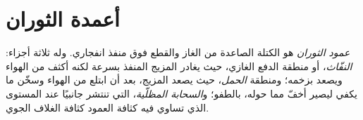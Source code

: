 \section{أعمدة الثوران}

\begin{definition}\label{def:b2:eruptive-styles:column}
\emph{عمود الثوران} هو الكتلة الصاعدة من الغاز
والقطع فوق منفذ انفجاري. وله ثلاثة أجزاء: \emph{النفّاث}، أو
منطقة الدفع الغازي، حيث يغادر المزيج المنفذ بسرعة لكنه أكثف من
الهواء ويصعد بزخمه؛ ومنطقة \emph{الحمل}، حيث يصعد المزيج،
بعد أن ابتلع من الهواء وسخّن ما يكفي ليصير أخفّ مما حوله،
بالطفو؛ و\emph{السحابة المظلّية}، التي تنتشر جانبيًا عند
المستوى الذي تساوي فيه كثافة العمود كثافة الغلاف الجوي.
\end{definition}

